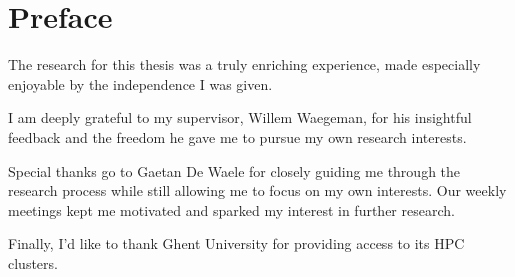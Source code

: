 \chapter*{Preface}
\thispagestyle{empty} %

The research for this thesis was a truly enriching experience, made especially enjoyable by the independence I was given.

I am deeply grateful to my supervisor, Willem Waegeman, for his insightful feedback and the freedom he gave me to pursue my own research interests.

Special thanks go to Gaetan De Waele for closely guiding me through the research process while still allowing me to focus on my own interests. Our weekly meetings kept me motivated and sparked my interest in further research.

Finally, I'd like to thank Ghent University for providing access to its HPC clusters.

\newpage\null\thispagestyle{empty} %